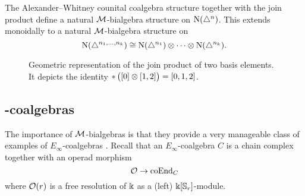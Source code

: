The Alexander--Whitney counital coalgebra structure together with the join product define a natural $\mathcal{M}$-bialgebra structure on $\operatorname{N}(\triangle^n)$. This extends monoidally to a natural $\mathcal{M}$-bialgebra structure on
\[
\operatorname{N}(\triangle^{n_1, \dots, n_k}) \cong
\operatorname{N}(\triangle^{n_1}) \otimes \dotsb \otimes \operatorname{N}(\triangle^{n_k}).
\]

\begin{figure}
	
	\caption{Geometric representation of the join product of two basis elements. It depicts the identity $\operatorname{\ast} \big( [0] \otimes [1,2] \big) = [0,1,2]$.}
	\label{f:join of faces}
\end{figure}

\subsection{\pdfEinfty-coalgebras}

The importance of $\mathcal{M}$-bialgebras is that they provide a very manageable class of examples of $E_\infty$-coalgebras \cite{medina2020prop1}.
Recall that an $E_\infty$-coalgebra $C$ is a chain complex together with an operad morphism
\[
\mathcal{O} \to \mathrm{coEnd}_C
\]
where $\mathcal{O}(r)$ is a free resolution of $\Bbbk$ as a (left) $\Bbbk[\mathbb{S}_r]$-module.